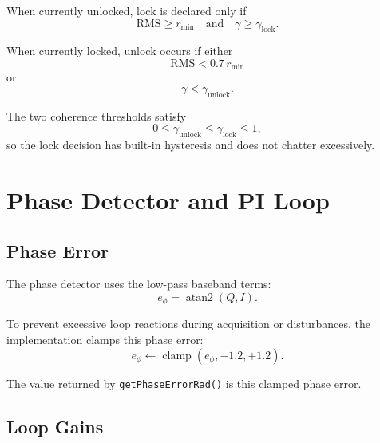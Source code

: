 \documentclass[conference]{IEEEtran}
\begin{document}
    When currently unlocked, lock is declared only if
    \begin{equation}
        \mathrm{RMS} \ge r_{\min}
        \quad\text{and}\quad
        \gamma \ge \gamma_{\mathrm{lock}}.
    \end{equation}

    When currently locked, unlock occurs if either
    \begin{equation}
        \mathrm{RMS} < 0.7\,r_{\min}
    \end{equation}
    or
    \begin{equation}
        \gamma < \gamma_{\mathrm{unlock}}.
    \end{equation}

    The two coherence thresholds satisfy
    \begin{equation}
        0 \le \gamma_{\mathrm{unlock}} \le \gamma_{\mathrm{lock}} \le 1,
    \end{equation}
    so the lock decision has built-in hysteresis and does not chatter excessively.

    \section{Phase Detector and PI Loop}\label{sec:loop}

    \subsection{Phase Error}

    The phase detector uses the low-pass baseband terms:
    \begin{equation}
        e_\phi = \operatorname{atan2}(Q, I).
    \end{equation}

    To prevent excessive loop reactions during acquisition or disturbances, the
    implementation clamps this phase error:
    \begin{equation}
        e_\phi \leftarrow \operatorname{clamp}(e_\phi,-1.2,+1.2).
    \end{equation}

    The value returned by \texttt{getPhaseErrorRad()} is this clamped phase error.

    \subsection{Loop Gains}
\end{document}
